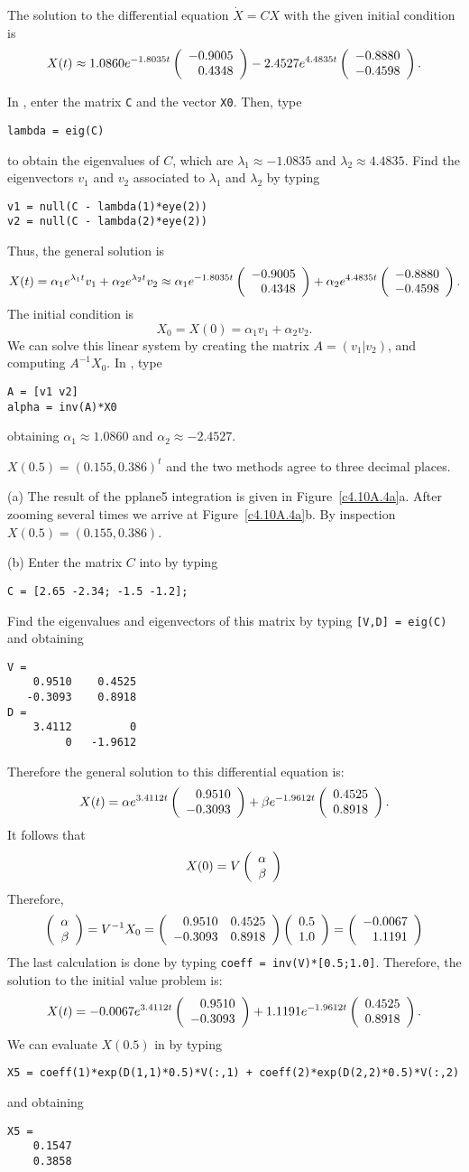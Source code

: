  \ans The solution to the differential equation $\dot{X}
= CX$ with the given initial condition is
\[
X(t) \approx 1.0860e^{-1.8035t}\left(\begin{array}{r} -0.9005 \\  0.4348\end{array}\right)
- 2.4527e^{4.4835t}\left(\begin{array}{r} -0.8880 \\ -0.4598\end{array}\right).
\]

\soln In \Matlabp, enter the matrix {\tt C} and the vector {\tt X0}.  Then,
type
\begin{verbatim}
lambda = eig(C)
\end{verbatim}
to obtain the eigenvalues of $C$, which are
$\lambda_1 \approx -1.0835$ and $\lambda_2 \approx 4.4835$.  Find the
eigenvectors $v_1$ and $v_2$ associated to $\lambda_1$ and $\lambda_2$
by typing
\begin{verbatim}
v1 = null(C - lambda(1)*eye(2))
v2 = null(C - lambda(2)*eye(2))
\end{verbatim}
Thus, the general solution is
\[
X(t) = \alpha_1e^{\lambda_1 t}v_1 + \alpha_2e^{\lambda_2 t}v_2
\approx \alpha_1e^{-1.8035t}\left(\begin{array}{r} -0.9005 \\  0.4348\end{array}\right) +
\alpha_2e^{4.4835t}\left(\begin{array}{r} -0.8880 \\ -0.4598\end{array}\right).
\]
The initial condition is
\[
X_0 = X(0) = \alpha_1v_1 + \alpha_2v_2.
\]
We can solve this linear system by creating the matrix $A = (v_1|v_2)$, and
computing $A^{-1}X_0$.  In \Matlabp, type
\begin{verbatim}
A = [v1 v2]
alpha = inv(A)*X0
\end{verbatim}
obtaining $\alpha_1 \approx 1.0860$ and $\alpha_2 \approx -2.4527$.

 \ans $X(0.5) = (0.155,0.386)^t$ and the two methods agree to three 
decimal places.

\soln (a) The result of the {\sf pplane5} integration is given in 
Figure~\ref{c4.10A.4a}a. After zooming several times we arrive at
Figure~\ref{c4.10A.4a}b.  By inspection $X(0.5)=(0.155,0.386)$.

(b)  Enter the matrix $C$ into \Matlab by typing
\begin{verbatim}
C = [2.65 -2.34; -1.5 -1.2];
\end{verbatim}
Find the eigenvalues and eigenvectors of this matrix by typing {\tt [V,D] = eig(C)}
and obtaining
\begin{verbatim}
V =
    0.9510    0.4525
   -0.3093    0.8918
D =
    3.4112         0
         0   -1.9612
\end{verbatim}
Therefore the general solution to this differential equation is:
\[
X(t) = \alpha e^{3.4112 t}\left(\begin{array}{r} 0.9510 \\ -0.3093\end{array}\right) +
\beta e^{-1.9612 t}\left(\begin{array}{r} 0.4525 \\ 0.8918\end{array}\right).
\]
It follows that 
\[
X(0) = V \left(\begin{array}{r} \alpha \\ \beta\end{array}\right)
\]
Therefore,
\[
\left(\begin{array}{r} \alpha \\ \beta\end{array}\right) = V^{-1} X_0 = 
\left(\begin{array}{rr} 0.9510 & 0.4525\\ -0.3093 &0.8918\end{array}\right)\left(\begin{array}{r} 0.5 \\ 1.0\end{array}\right) = \left(\begin{array}{r} -0.0067 \\ 1.1191\end{array}\right)
\]
The last calculation is done by typing {\tt coeff = inv(V)*[0.5;1.0]}. 
Therefore, the solution to the initial value problem is:
\[
X(t) = -0.0067e^{3.4112 t}\left(\begin{array}{r} 0.9510 \\ -0.3093\end{array}\right) +
1.1191e^{-1.9612 t}\left(\begin{array}{r} 0.4525 \\ 0.8918\end{array}\right).
\]
We can evaluate $X(0.5)$ in \Matlab by typing
\begin{verbatim}
X5 = coeff(1)*exp(D(1,1)*0.5)*V(:,1) + coeff(2)*exp(D(2,2)*0.5)*V(:,2)
\end{verbatim}
and obtaining
\begin{verbatim}
X5 =
    0.1547
    0.3858
\end{verbatim}


